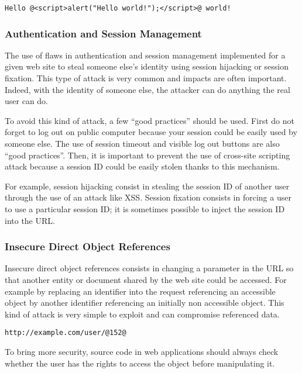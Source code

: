 \begin{lstlisting}[style=beamer,
	caption={XSS test},
	label=lst:xss-input]
Hello @<script>alert("Hello world!");</script>@ world!
\end{lstlisting}

\subsubsection{Authentication and Session Management}

The use of flaws in authentication and session management
implemented for a given web site to steal someone else's identity using
session hijacking or session fixation. This type of attack is very
common and impacts are often important. Indeed, with the identity of someone
else, the attacker can do anything the real user can do.

To avoid this kind of attack, a few ``good practices'' should be used. First do not
forget to log out on public computer because your session could be easily used
by someone else. The use of session timeout and visible
log out buttons are also ``good practices''. Then, it is important to prevent the use of cross-site scripting
attack because a session ID could be easily stolen thanks to this mechanism.

For example, session hijacking consist in stealing the session ID of another
user through the use of an attack like XSS. Session fixation consists in
forcing a user to use a particular session ID; it is sometimes possible to
inject the session ID into the URL.

\subsubsection{Insecure Direct Object References}

Insecure direct object references consists in changing a parameter in the URL
so that another entity or document shared by the web site could be accessed.
For example by replacing an identifier into the request referencing an
accessible object by another identifier referencing an initially non accessible
object. This kind of attack is very simple to exploit and can compromise
referenced data.

\begin{lstlisting}[style=beamer]
http://example.com/user/@152@
\end{lstlisting}

To bring more security, source code in web applications should
always check whether the user has the rights to access the object before
manipulating it.


